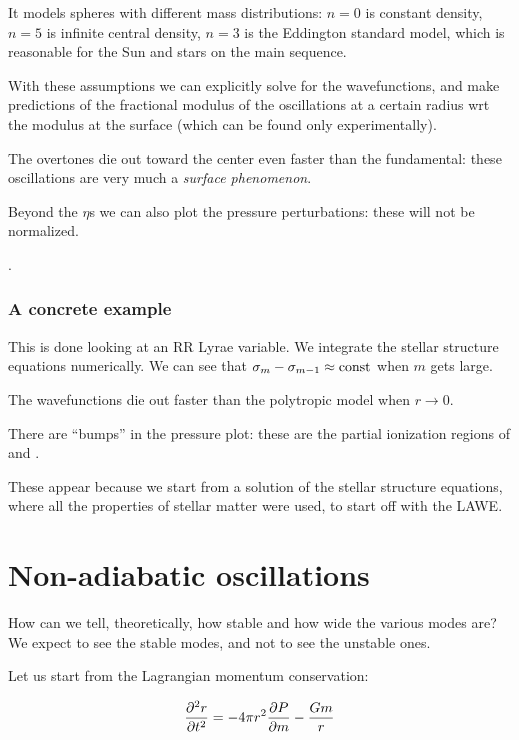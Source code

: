 \documentclass[main.tex]{subfiles}
\begin{document}
It models spheres with different mass distributions:
\(n=0\) is constant density, \(n=5\) is infinite central density, \(n=3\) is the Eddington standard model, which is reasonable for the Sun and stars on the main sequence.

With these assumptions we can explicitly solve for the wavefunctions, and make predictions of the fractional modulus of the oscillations at a certain radius wrt the modulus at the surface (which can be found only experimentally).

The overtones die out toward the center even faster than the fundamental: these oscillations are very much a \emph{surface phenomenon}.

Beyond the \(\eta\)s we can also plot the pressure perturbations: these will not be normalized.

. 

\subsubsection{A concrete example}

This is done looking at an RR Lyrae variable.
We integrate the stellar structure equations numerically.
We can see that \(\sigma_m - \sigma_{m-1} \approx \text{const}\) when \(m\) gets large.

The wavefunctions die out faster than the polytropic model when \(r \rightarrow 0\).

There are ``bumps'' in the pressure plot: these are the partial ionization regions of  and .

These appear because we start from a solution of the stellar structure equations, where all the properties of stellar matter were used, to start off with the LAWE.

\section{Non-adiabatic oscillations}

How can we tell, theoretically, how stable and how wide the various modes are?
We expect to see the stable modes, and not to see the unstable ones.

Let us start from the Lagrangian momentum conservation:

\begin{equation}
    \pdv[2]{r}{t} = - 4 \pi r^2 \pdv{P}{m} - \frac{Gm}{r}
\end{equation}
\end{document}
